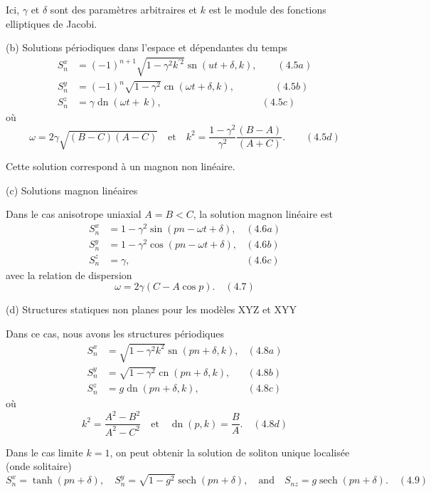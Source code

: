 \documentclass{article}
\begin{document}
   Ici, \(\gamma\) et \(\delta\) sont des paramètres arbitraires et \(k\) est le module des fonctions elliptiques de Jacobi.
   
   (b) Solutions périodiques dans l'espace et dépendantes du temps
   \begin{align*}
   S_{n}^x &= (-1)^{n+1}\sqrt{1 - \gamma^2k^{'2}}\operatorname{sn}(ut + \delta, k),   \qquad (4.5a)\\
   S_{n}^{y} &= (-1)^n\sqrt{1 - \gamma^2}\operatorname{cn}(\omega t + \delta, k),\qquad \qquad (4.5b) \\
   S_{n}^{z} &= \gamma \operatorname{dn}(\omega t + \, k), \qquad \qquad \qquad \qquad \qquad (4.5c)
   \end{align*}
   où
   \[
   \omega = 2\gamma\sqrt{(B - C)(A - C)}  \quad \text{et} \quad k^2 = \frac{ 1 - \gamma^2}{\gamma^{2}}\frac{(B - A)}{(A + C)}. \qquad (4.5d)
   \]
   
   Cette solution correspond à un magnon non linéaire.
   
   (c) Solutions magnon linéaires
   
   Dans le cas anisotrope uniaxial $A = B < C$, la solution magnon linéaire est
   \begin{align*}
  S_{n}^{x} &= 1 - \gamma^2 \sin(pn - \omega t + \delta), & (4.6a) \\
  S_{n}^{y} &= 1 - \gamma^2 \cos(pn - \omega t + \delta), & (4.6b) \\
  S_{n}^{z} &= \gamma, & (4.6c)
  \end{align*}
   avec la relation de dispersion
   \[
  \omega = 2\gamma(C - A \cos p). \quad (4.7)
  \]
   
   (d) Structures statiques non planes pour les modèles XYZ et XYY
   
   Dans ce cas, nous avons les structures périodiques
  \begin{align*}
  S_{n}^{x} &= \sqrt{1 - \gamma^2 k^2} \operatorname{sn}(pn + \delta, k), & (4.8a) \\
  S_{n}^{y} &= \sqrt{1 - \gamma^2} \operatorname{cn}(pn + \delta, k), & (4.8b) \\
  S_{n}^{z} &= g \operatorname{dn}(pn + \delta, k), & (4.8c)
  \end{align*}
   où
   \[
   k^2 = \frac{A^2 - B^2}{A^2 - C^2} \quad \text{et} \quad \operatorname{dn}(p, k) = \frac{B}{A}. \quad (4.8d)
   \]
   
   Dans le cas limite $k = 1$, on peut obtenir la solution de soliton unique localisée (onde solitaire)
   \[
  S_{n}^{x} = \tanh(pn + \delta), \quad S_{n}^{y} = \sqrt{1 - g^2} \operatorname{sech}(pn + \delta), \quad \text{and} \quad S_{nz} = g \operatorname{sech}(pn + \delta). \quad (4.9)
  \]
   
\end{document}
